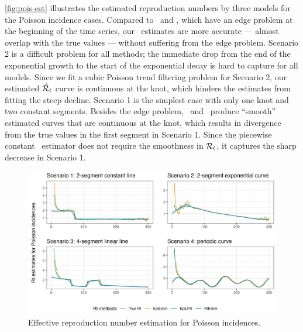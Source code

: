 \autoref{fig:pois-est} illustrates the estimated reproduction numbers by three models for the Poisson incidence cases. Compared to \EpiEstim\ and \EpiLPS, which have an edge problem at the beginning of the time series, our \RtEstim\ estimates are more accurate --- almost overlap with the true values --- without suffering from the edge problem. Scenario 2 is a difficult problem for all methods; the immediate drop from the end of the exponential growth to the start of the exponential decay is hard to capture for all models. Since we fit a cubic Poisson trend filtering problem for Scenario 2, our estimated $\hat{\mathcal{R}}_t$ curve is continuous at the knot, which hinders the estimates from fitting the steep decline. 
Scenario 1 is the simplest case with only one knot and two constant segments. Besides the edge problem, \EpiEstim\ and \EpiLPS\ produce ``smooth'' estimated curves that are continuous at the knot, which results in divergence from the true values in the first segment in Scenario 1. Since the piecewise constant \RtEstim\ estimator does not require the smoothness in $\mathcal{R}_t$, it captures the sharp decrease in Scenario 1. 
\begin{figure}[tb]
    \centering
    \includegraphics*[width=160mm]{fig/Pois-res-plot.png}
    \caption{Effective reproduction number estimation for Poisson incidences.}
    \label{fig:pois-est}
\end{figure}


